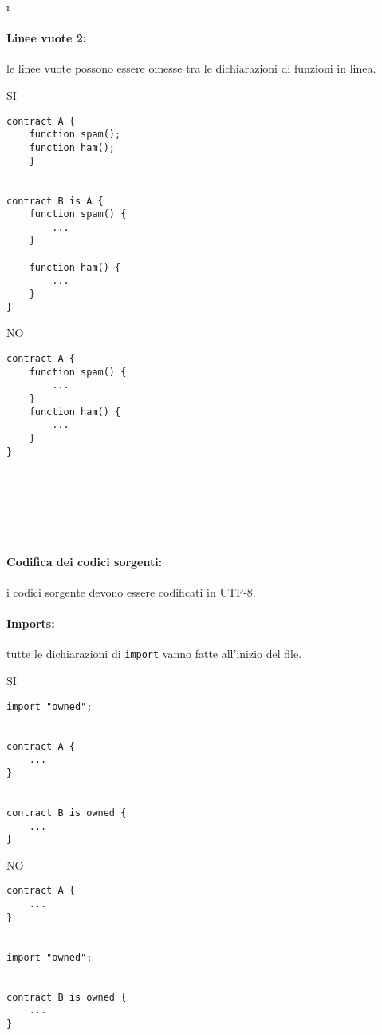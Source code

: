r\documentclass[../ProcessiPrimari.tex]{subfiles}
\begin{document}
\paragraph{Linee vuote 2: }
le linee vuote possono essere omesse tra le dichiarazioni di funzioni in linea.
\begin{center}{
\begin{minipage}{6cm}
{\begin{center}SI\end{center}}
\begin{Verbatim}[frame=single]
contract A {
    function spam();
    function ham();
    }


contract B is A {
    function spam() {
        ...
    }

    function ham() {
        ...
    }
}
\end{Verbatim}
\end{minipage}
\hfil
\begin{minipage}{6cm}
{\begin{center}NO\end{center}}
\begin{Verbatim}[frame=single]
contract A {
    function spam() {
        ...
    }
    function ham() {
        ...
    }
}







\end{Verbatim}
\end{minipage}
}
\end{center}

\paragraph*{Codifica dei codici sorgenti: }
i codici sorgente devono essere codificati in UTF-8.

\paragraph*{Imports: }
tutte le dichiarazioni di \texttt{import} vanno fatte all'inizio del file.

\begin{center}{
\begin{minipage}{6cm}
{\begin{center}SI\end{center}}
\begin{Verbatim}[frame=single]
import "owned";


contract A {
    ...
}


contract B is owned {
    ...
}
\end{Verbatim}
\end{minipage}
\hfil
\begin{minipage}{6cm}
{\begin{center}NO\end{center}}
\begin{Verbatim}[frame=single]
contract A {
    ...
}


import "owned";


contract B is owned {
    ...
}
\end{Verbatim}
\end{minipage}
}
\end{center}
\end{document}
